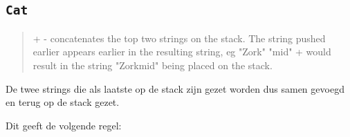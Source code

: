 \subsection{\texttt{Cat}}
\label{sec:rules:cat}

\begin{quote}
    + - concatenates the top two strings on the stack. The string pushed earlier
    appears earlier in the resulting string, eg
    "Zork" "mid" +
    would result in the string "Zorkmid" being placed on the stack.
\end{quote}

De twee strings die als laatste op de stack zijn gezet worden dus samen gevoegd en terug op de stack gezet.  

Dit geeft de volgende regel:

